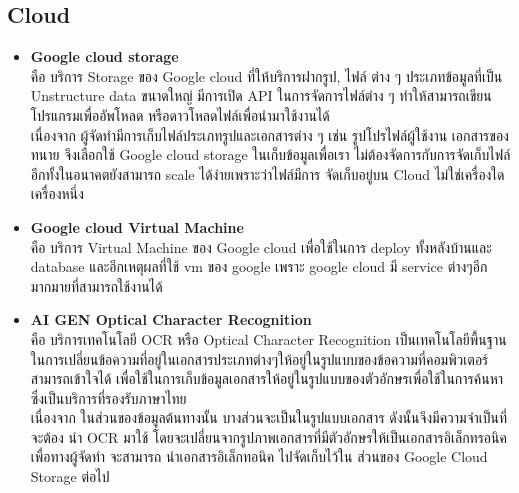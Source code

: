 \documentclass[12pt,oneside,openright,a4paper]{cpe-thai-project}
\begin{document}
\subsection{Cloud}
\begin{itemize}
\item \textbf{Google cloud storage} \\
\hspace*{1cm} คือ บริการ Storage ของ Google cloud ที่ให้บริการฝากรูป, ไฟล์ ต่าง ๆ ประเภทข้อมูลที่เป็น Unstructure data ขนาดใหญ่ มีการเปิด API ในการจัดการไฟล์ต่าง ๆ ทำให้สามารถเขียนโปรแกรมเพื่ออัพโหลด หรือดาวโหลดไฟล์เพื่อนำมาใช้งานได้ \\
\hspace*{1cm} เนื่องจาก ผู้จัดทำมีการเก็บไฟล์ประเภทรูปและเอกสารต่าง ๆ เช่น รูปโปรไฟล์ผู้ใช้งาน เอกสารของทนาย จึงเลือกใช้ Google cloud storage ในเก็บข้อมูลเพื่อเรา ไม่ต้องจัดการกับการจัดเก็บไฟล์ อีกทั้งในอนาคตยังสามารถ scale ได้ง่ายเพราะว่าไฟล์มีการ จัดเก็บอยู่บน Cloud ไม่ใช่เครื่องใดเครื่องหนึ่ง
\item \textbf{Google cloud Virtual Machine} \\
\hspace*{1cm}	คือ บริการ Virtual Machine ของ Google cloud เพื่อใช้ในการ deploy ทั้งหลังบ้านและ database และอีกเหตุผลที่ใช้ vm ของ google เพราะ google cloud มี service ต่างๆอีกมากมายที่สามารถใช้งานได้ 
\item \textbf{AI GEN Optical Character Recognition} \\
\hspace*{1cm} คือ บริการเทคโนโลยี OCR หรือ Optical Character Recognition เป็นเทคโนโลยีพื้นฐานในการเปลี่ยนข้อความที่อยู่ในเอกสารประเภทต่างๆให้อยู่ในรูปแบบของข้อความที่คอมพิวเตอร์สามารถเข้าใจได้ เพื่อใช้ในการเก็บข้อมูลเอกสารให้อยู่ในรูปแบบของตัวอักษรเพื่อใช้ในการค้นหา ซึ่งเป็นบริการที่รองรับภาษาไทย \\
\hspace*{1cm} เนื่องจาก ในส่วนของข้อมูลต้นทางนั้น บางส่วนจะเป็นในรูปแบบเอกสาร ดังนั้นจึงมีความจำเป็นที่จะต้อง นำ OCR มาใช้ โดยจะเปลี่ยนจากรูปภาพเอกสารที่มีตัวอักษรให้เป็นเอกสารอิเล็กทรอนิค เพื่อทางผู้จัดทำ จะสามารถ นำเอกสารอิเล็กทอนิค ไปจัดเก็บไว้ใน ส่วนของ Google Cloud Storage ต่อไป 
\end{itemize}
\end{document}
